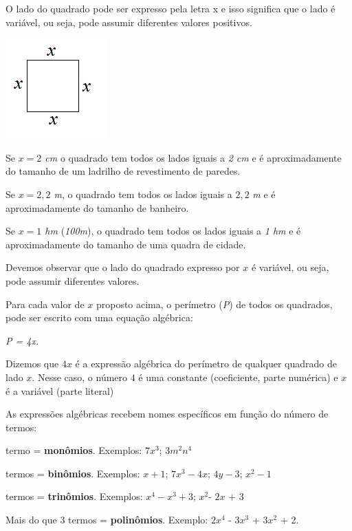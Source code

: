 \begin{texemplo}
    \setlength{\parskip}{.5em}
    O lado do quadrado pode ser expresso pela letra  x  e isso significa que o lado é variável, ou seja, pode assumir diferentes valores positivos.

    \begin{center}
        \includegraphics{capitulos/expressoes_algebricas/media/image2.png}
    \end{center}

    \noindent Se \textit{$x = 2$ cm} o quadrado tem todos os lados iguais a \textit{2 cm} e é aproximadamente do tamanho de um ladrilho de revestimento de paredes.

    \noindent Se \textit{$x = 2,2$ m}, o quadrado tem todos os lados iguais a $2,2$ \textit{m} e é aproximadamente do tamanho de banheiro.

    \noindent Se \textit{$x = 1$ hm} (\textit{100m}), o quadrado tem todos os lados iguais a \textit{1 hm} e é aproximadamente do tamanho de uma quadra de cidade.

    \noindent Devemos observar que o lado do quadrado expresso por $x$ é variável, ou seja, pode assumir diferentes valores.

    \noindent Para cada valor de $x$ proposto acima, o perímetro (\textit{P}) de todos os quadrados, pode ser escrito com uma equação algébrica:


    \begin{center}
        \textit{P = 4x.}
    \end{center}
        
    \noindent Dizemos que $4x$ é a expressão algébrica do perímetro de qualquer quadrado de lado $x$. Nesse caso, o número $4$ é uma constante (coeficiente, parte numérica) e $x$ é a variável (parte literal) \qedsymbol
    
    \noindent As expressões algébricas recebem nomes específicos em função do número de termos:
    
    \setlength{\parskip}{.5em}
     termo = \textbf{monômios}. Exemplos: $7x^3$; $3m^2n^4$\par
    \setlength{\parskip}{0em}
     termos = \textbf{binômios}. Exemplos:  $x+1$; $7x^3 -4x$; $4y - 3$; $x^2 - 1$\par
     termos = \textbf{trinômios}. Exemplos: $x^4 - x^3 + 3$; $x^2$- $2x$ + 3\par
    \noindent Mais do que 3 termos = \textbf{polinômios}. Exemplo: $2x^4$ - $3x^3$ + $3x^2$ + 2.
        

\end{texemplo}

